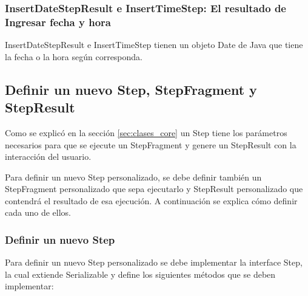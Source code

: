 \subsubsection{InsertDateStepResult e InsertTimeStep: El resultado de Ingresar fecha y hora}
InsertDateStepResult e InsertTimeStep tienen un objeto Date de Java que tiene la fecha o la hora según corresponda.



\subsection{Definir un nuevo Step, StepFragment y StepResult} \label{sec:definir_steps}
Como se explicó en la sección \ref{sec:clases_core} un Step tiene los parámetros necesarios para que se ejecute un StepFragment y genere un  StepResult con la interacción del usuario.

Para definir un nuevo Step personalizado, se debe definir también un StepFragment personalizado que sepa ejecutarlo y StepResult personalizado que contendrá el resultado de esa ejecución. A continuación se explica cómo definir cada uno de ellos.

\subsubsection{Definir un nuevo Step}
Para definir un nuevo Step personalizado se debe implementar la interface Step, la cual extiende Serializable y define los siguientes métodos que se deben implementar:

